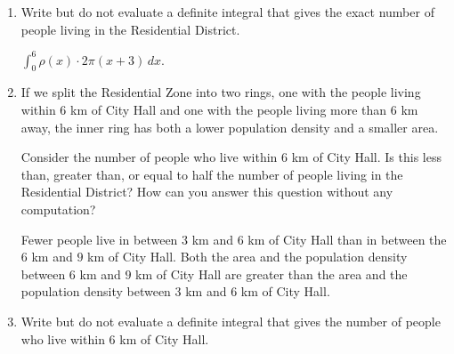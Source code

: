 \documentclass{article}
\begin{document}
\begin{enumerate}
\begin {enumerate}
    \begin{problem}
      Write a Riemann sum that approximates the number of people
      living in the Residential District.
    \end{problem}

    \begin{solution}
      $\displaystyle \sum_{k=1}^n \rho(x_k) \cdot 2 \pi (x_k + 3) \Delta
      x$. 
    \end{solution}
    \pspace{\vfill}
    \pspace{\newpage}
    
  \item
    \begin{problem}
      Write but do not evaluate a definite integral that gives the exact number of people living in the
      Residential District.
    \end{problem}

    \begin{solution}
      $\displaystyle \int_0^6 \rho(x) \cdot 2 \pi (x + 3)\,dx$. 
    \end{solution}
\pspace{\vfill}
  \item

    \begin{workshop}
      If we split the Residential Zone into two rings, one with the people
      living within 6 km of City Hall and one with the people living more
      than 6 km away, the inner ring has both a lower population density
      and a smaller area.
    \end{workshop}

    \begin{problem}
      Consider the number of people who live within 6 km of City Hall.  Is
      this less than, greater than, or equal to half the number of people
      living in the Residential District?  How can you answer this question
      without any computation?
    \end{problem}

    \begin{solution}
       Fewer people live in between $3$ km and $6$ km of City Hall than in between the $6$ km and $9$ km of City Hall. Both the area and the population density between $6$ km and $9$ km of City Hall are greater than the area and the population density between $3$ km and $6$ km of City Hall.
    \end{solution}
\pspace{\vfill}
  \item
    \begin{problem}
      Write but do not evaluate a definite integral that gives the number of people who live within 6
      km of City Hall.  
    \end{problem}


\end{enumerate}
\end{enumerate}
\end{document}

